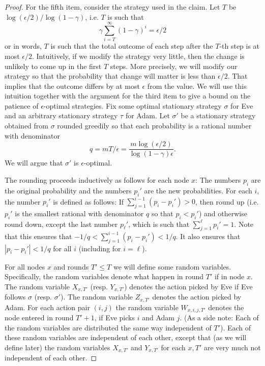 \begin{proof}
For the fifth item, consider the strategy used in the claim. 
Let $T$ be $\log(\epsilon/2)/\log(1-\gamma)$, i.e. $T$ is such that \[
\gamma \sum_{i=T}^{\infty}(1-\gamma)^i=\epsilon/2
\]
or in words, $T$ is such that the total outcome of each step after the $T$-th step is at most $\epsilon/2$.
Intuitively, if we modify the strategy very little, then the change is unlikely to come up in the first $T$ steps. More precisely, we will modify our strategy so that the probability that change will matter is less than $\epsilon/2$. That implies that the outcome differs by at most $\epsilon$ from the value.
We will use this intuition together with the argument for the third item to give a bound on the patience of $\epsilon$-optimal strategies. Fix some optimal stationary strategy $\sigma$ for Eve and an arbitrary stationary strategy $\tau$ for Adam. Let $\sigma'$ be a stationary strategy obtained from $\sigma$ rounded greedily  so that each probability is a rational number with denominator \[
q=mT/\epsilon=\frac{m\log(\epsilon/2)}{\log(1-\gamma)\epsilon}.
\] We will argue that $\sigma'$ is $\epsilon$-optimal.

The rounding proceeds inductively as follows for each node $x$:
The numbers $p_i$ are the original probability and the numbers $p_i'$ are the new probabilities.
For each $i$, the number $p_i'$ is defined as follows: If $\sum_{j=1}^{i-1}(p_i-p_i')>0$, then round up (i.e. $p_i'$ is the smallest rational with denominator $q$ so that $p_i<p_i'$) and otherwise round down, except the last number $p_\ell'$, which is such that $\sum_{j=1}^{\ell}p_i'=1$.
Note that this ensures that $-1/q<\sum_{j=1}^{i-1}(p_i-p_i')<1/q$. It also ensures that $|p_i-p_i'|<1/q$ for all $i$ (including for $i=\ell$).

For all nodes $x$ and rounds $T'\leq T$ we will define some random variables.
Specifically, the random variables denote what happen in round $T'$ if in node $x$.
The random variable $X_{x,T'}$ (resp. $Y_{x,T'}$) denotes the action picked by Eve if Eve follows $\sigma$ (resp. $\sigma'$).
The random variable $Z_{x,T'}$ denotes the action picked by Adam.
For each action pair $(i,j)$  the random variable $W_{x,i,j,T'}$ denotes the node entered in round $T'+1$, if Eve picks $i$ and Adam $j$. 
(As a side note: Each of the random variables are distributed the same way independent of $T'$).
Each of these random variables are independent of each other, except that (as we will define later) the random variables $X_{x,T'}$ and $Y_{x,T'}$ for each $x,T'$ are very much not independent of each other.


\end{proof}
